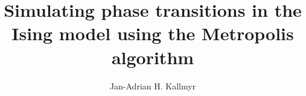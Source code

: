 \documentclass[a4paper, 11pt, twocolumn]{article}
\begin{document}
\title{Simulating phase transitions in the Ising model using the Metropolis algorithm}

\author{Jan-Adrian H. Kallmyr}

\twocolumn[
  \begin{@twocolumnfalse}
    \maketitle
    
  \end{@twocolumnfalse}
]














\end{document}
